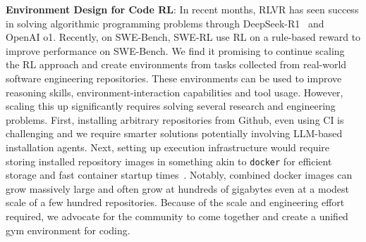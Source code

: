 \textbf{Environment Design for Code RL}: In recent months, RLVR has seen success in solving algorithmic programming problems through DeepSeek-R1~\citep{deepseekai2025deepseekr1} and OpenAI o1. Recently, on SWE-Bench, SWE-RL \citep{wei2025swerladvancingllmreasoning} use RL on a rule-based reward to improve performance on SWE-Bench. We find it promising to continue scaling the RL approach and create environments from tasks collected from real-world software engineering repositories. These environments can be used to improve reasoning skills, environment-interaction capabilities and tool usage. However, scaling this up significantly requires solving several research and engineering problems. 
First, installing arbitrary repositories from Github, even using CI is challenging and we require smarter solutions potentially involving LLM-based installation agents.
Next, setting up execution infrastructure would require storing installed repository images in something akin to \verb|docker| for efficient storage and fast container startup times~\citep{team2025kimi}.
Notably, combined docker images can grow massively large and often grow at hundreds of gigabytes even at a modest scale of a few hundred repositories. Because of the scale and engineering effort required, we advocate for the community to come together and create a unified gym environment for coding.




